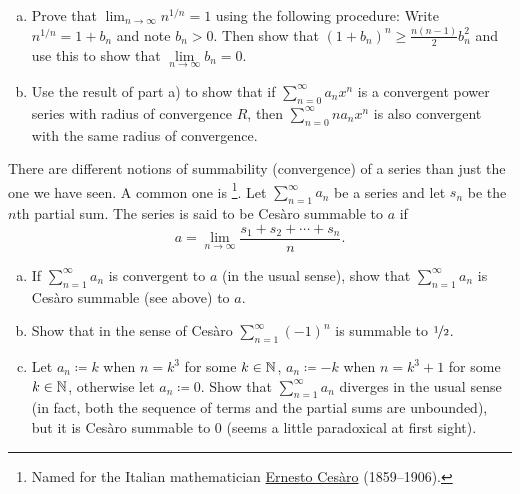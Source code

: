 \begin{samepage}
\begin{exercise}
\leavevmode
\begin{enumerate}[a)]
\item
Prove that $\lim_{n\to\infty} n^{1/n} = 1$ using the following procedure:  Write $n^{1/n} = 1+b_n$ and
note $b_n > 0$.  Then show that ${(1+b_n)}^n \geq 
\frac{n(n-1)}{2}b_n^2$ and use this to show that $\lim\limits_{n\to\infty} b_n = 0$.
\item
Use the result of part a) to show that
if $\sum_{n=0}^\infty a_n x^n$ is a convergent power series with radius of convergence $R$,
then $\sum_{n=0}^\infty n a_n x^n$ is also convergent with the same radius of convergence.
\end{enumerate}
\end{exercise}
\end{samepage}

\begin{exnote}
There are different notions of summability (convergence)
of a series
than just the one we have seen.
A common one is \emph{}%
\footnote{Named for the Italian mathematician
\href{https://en.wikipedia.org/wiki/Ernesto_Ces\%C3\%A0ro}{Ernesto Ces\`aro}
(1859--1906).}.  Let $\sum_{n=1}^\infty a_n$ be a series
and let $s_n$ be the $n$th partial sum.  The series is said to
be Ces\`aro summable to $a$ if
\begin{equation*}
a = \lim_{n\to \infty} \frac{s_1 + s_2 + \cdots + s_n}{n} .
\end{equation*}
\end{exnote}

\begin{exercise}[Challenging]
\pagebreak[2]
\leavevmode
\begin{enumerate}[a)]
\item
If $\sum_{n=1}^\infty a_n$ is convergent to $a$ (in the usual sense), show that
$\sum_{n=1}^\infty a_n$ is Ces\`aro summable (see above) to $a$.
\item
Show that in the sense of Ces\`aro $\sum_{n=1}^\infty {(-1)}^n$ is summable to
$\nicefrac{1}{2}$.
\item
Let $a_n \coloneqq k$ when $n = k^3$ for some $k \in {\mathbb{N}}$,
$a_n \coloneqq -k$ when $n = k^3+1$ for some $k \in {\mathbb{N}}$,
otherwise
let $a_n \coloneqq 0$.  Show that $\sum_{n=1}^\infty a_n$ diverges in the usual sense
(in fact, both the sequence of terms and the partial sums are unbounded), but it is
Ces\`aro summable to 0 (seems a little paradoxical at first sight).
\end{enumerate}
\end{exercise}

